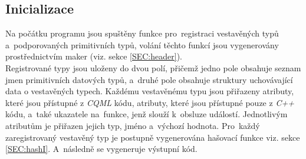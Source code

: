 \documentclass[11pt,twoside,a4paper]{book}
\begin{document}
\subsection{Inicializace}
Na počátku programu jsou spuštěny funkce pro~registraci vestavěných typů a~podporovaných primitivních typů, volání těchto funkcí jsou vygenerovány prostřednictvím maker (viz. sekce \ref{SEC:header}).\\
Registrované typy jsou uloženy do dvou polí, přičemž jedno pole obsahuje seznam jmen primitivních datových typů, a~druhé pole obsahuje struktury uchovávající data o vestavěných typech. Každému vestavěnému typu jsou přiřazeny atributy, které jsou přístupné z \textit{CQML} kódu, atributy, které jsou přístupné pouze z \textit{C++} kódu, a~také ukazatele na~funkce, jenž slouží k~obsluze událostí. Jednotlivým atributům je přiřazen jejich typ, jméno a~výchozí hodnota. Pro~každý zaregistrovaný vestavěný typ je postupně vygenerována hašovací funkce viz. sekce \ref{SEC:hashI}. A~následně se vygeneruje výstupní kód.\\
\end{document}
